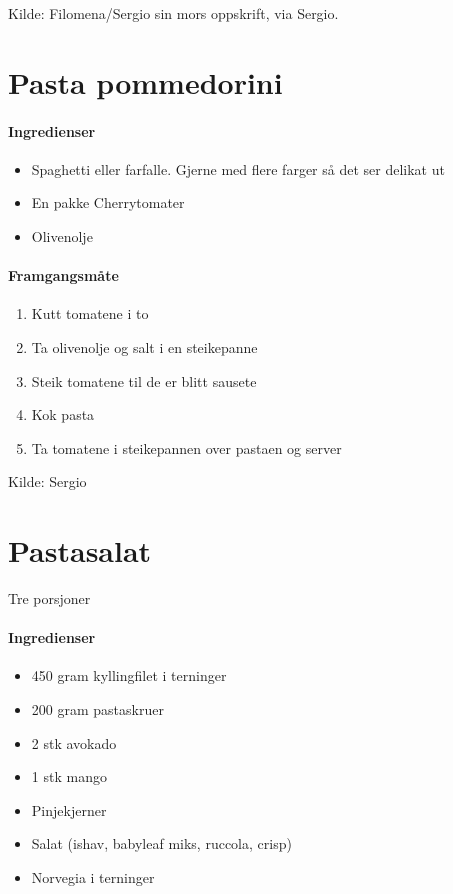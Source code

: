 \documentclass[12pt,a4paper]{book}
\begin{document}
{Kilde: Filomena/Sergio sin mors oppskrift, via Sergio.
\clearpage{}
\clearpage{}\section{﻿Pasta pommedorini}

\paragraph{Ingredienser}
\begin{itemize}[noitemsep]
	\item Spaghetti eller farfalle. Gjerne med flere farger så det ser delikat ut
	\item En pakke Cherrytomater
	\item Olivenolje
\end{itemize}

\paragraph{Framgangsmåte}
\begin{enumerate}[noitemsep]
	\item Kutt tomatene i to
	\item Ta olivenolje og salt i en steikepanne
	\item Steik tomatene til de er blitt sausete
	\item Kok pasta
	\item Ta tomatene i steikepannen over pastaen og server
\end{enumerate}


Kilde: Sergio
\clearpage{}
\clearpage{}\section{﻿Pastasalat}
Tre porsjoner

\paragraph{Ingredienser}
\begin{itemize}[noitemsep]
	\item 450 gram kyllingfilet i terninger
	\item 200 gram pastaskruer
	\item 2 stk avokado
	\item 1 stk mango
	\item Pinjekjerner
	\item Salat (ishav, babyleaf miks, ruccola, crisp)
	\item Norvegia i terninger
\end{itemize}

}
\end{document}
